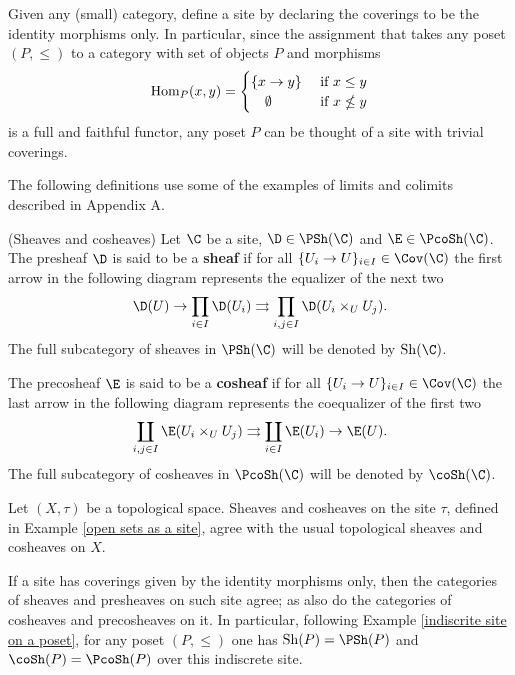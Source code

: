 \documentclass[thesis.tex]{subfiles}
\begin{document}
\begin{example}\label{indiscrite site on a poset}
Given any (small) category, define a site by declaring the coverings to be the identity morphisms only.
In particular, since the assignment that takes any poset $(P,\leq)$ to a category with set of objects $P$ and morphisms $$\mathrm{Hom}_P(x,y)=\begin{cases}\{x\to y\}& \text{ if } x\leq y\\ \ \ \ \emptyset & \text{ if } x\nleq y\end{cases}$$ is a full and faithful functor, any poset $P$ can be thought of a site with trivial coverings.
\end{example}

The following definitions use some of the examples of limits and colimits described in Appendix A.

\begin{definition}(Sheaves and cosheaves)
Let $\C$ be a site, $\D\in\PSh(\C)$ and $\E\in\PcoSh(\C)$.
The presheaf $\D$ is said to be a \textbf{sheaf} if for all $\{U_i\to U\}_{i\in I}\in\Cov(\C)$ the first arrow in the following diagram represents the equalizer of the next two $$\D(U)\to\prod_{i\in I}\D(U_i)\rightrightarrows\prod_{i,j\in I}\D(U_i\times_U U_j).$$ The full subcategory of sheaves in $\PSh(\C)$ will be denoted by $\Sh(\C)$.\par

The precosheaf $\E$ is said to be a \textbf{cosheaf} if for all $\{U_i\to U\}_{i\in I}\in\Cov(\C)$ the last arrow in the following diagram represents the coequalizer of the first two $$\coprod_{i,j\in I}\E(U_i\times_U U_j)\rightrightarrows\coprod_{i\in I}\E(U_i)\to\E(U).$$
The full subcategory of cosheaves in $\PcoSh(\C)$ will be denoted by $\coSh(\C)$.
\end{definition}

\begin{example}
Let $(X,\tau)$ be a topological space.
Sheaves and cosheaves on the site $\tau$, defined in Example \ref{open sets as a site}, agree with the usual topological sheaves and cosheaves on $X$.
\end{example}

\begin{example}
If a site has coverings given by the identity morphisms only, then the categories of sheaves and presheaves on such site agree; as also do the categories of cosheaves and precosheaves on it.
In particular, following Example \ref{indiscrite site on a poset}, for any poset $(P,\leq)$ one has $\Sh(P)=\PSh(P)$ and $\coSh(P)=\PcoSh(P)$ over this indiscrete site.
\end{example}
\end{document}
